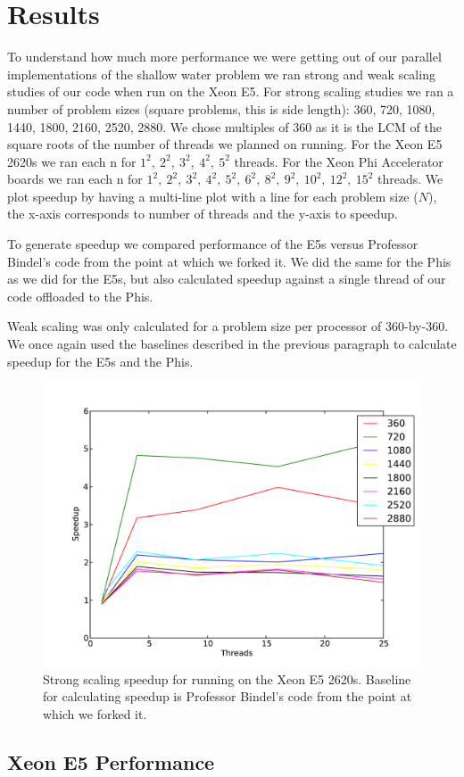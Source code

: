 \section{Results}

To understand how much more performance we were getting out of our parallel implementations of the shallow water problem we ran strong and weak scaling studies of our code when run on the Xeon E5. For strong scaling studies we ran a number of problem sizes (square problems, this is side length): 360, 720, 1080, 1440, 1800, 2160, 2520, 2880. We chose multiples of 360 as it is the LCM of the square roots of the number of threads we planned on running. For the Xeon E5 2620s we ran each n for $1^2,~2^2,~3^2,~4^2,~5^2$ threads. For the Xeon Phi Accelerator boards we ran each n for $1^2,~2^2,~3^2,~4^2,~5^2,~6^2,~8^2,~9^2,~10^2,~12^2,~15^2$ threads. We plot speedup by having a multi-line plot with a line for each problem size ($N$), the x-axis corresponds to number of threads and the y-axis to speedup.

To generate speedup we compared performance of the E5s versus Professor Bindel's code from the point at which we forked it. We did the same for the Phis as we did for the E5s, but also calculated speedup against a single thread of our code offloaded to the Phis.

Weak scaling was only calculated for a problem size per processor of 360-by-360. We once again used the baselines described in the previous paragraph to calculate speedup for the E5s and the Phis.

\begin{figure}[h!]
\centering
\includegraphics[width=0.5\linewidth]{e5_strong_bindel_baseline.pdf}
\caption{Strong scaling speedup for running on the Xeon E5 2620s. Baseline for calculating speedup is Professor Bindel's code from the point at which we forked it.}
\label{fig:strong-e5}
\end{figure}

\subsection{Xeon E5 Performance}

